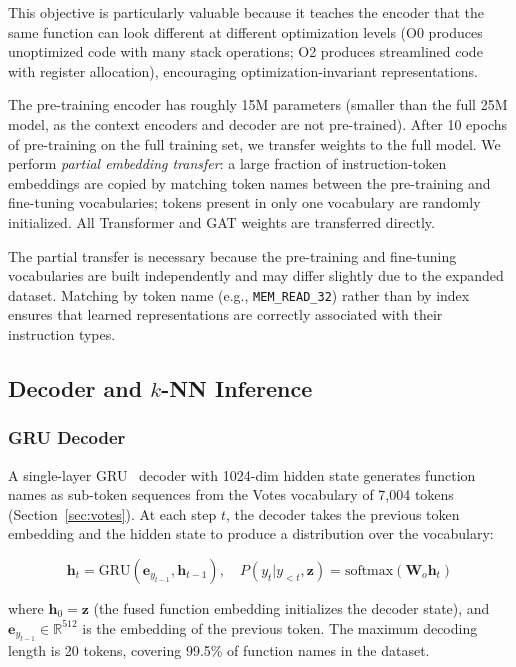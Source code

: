 \documentclass[sigconf,nonacm]{acmart}
\begin{document}
This objective is particularly valuable because it teaches the encoder that the same function can look different at different optimization levels (O0 produces unoptimized code with many stack operations; O2 produces streamlined code with register allocation), encouraging optimization-invariant representations.

The pre-training encoder has roughly 15M parameters (smaller than the full 25M model, as the context encoders and decoder are not pre-trained). After 10 epochs of pre-training on the full training set, we transfer weights to the full model. We perform \emph{partial embedding transfer}: a large fraction of instruction-token embeddings are copied by matching token names between the pre-training and fine-tuning vocabularies; tokens present in only one vocabulary are randomly initialized. All Transformer and GAT weights are transferred directly.

The partial transfer is necessary because the pre-training and fine-tuning vocabularies are built independently and may differ slightly due to the expanded dataset. Matching by token name (e.g., \texttt{MEM\_READ\_32}) rather than by index ensures that learned representations are correctly associated with their instruction types.

\subsection{Decoder and $k$-NN Inference}
\label{sec:decoder}

\subsubsection{GRU Decoder}
A single-layer GRU~\cite{gru} decoder with 1024-dim hidden state generates function names as sub-token sequences from the Votes vocabulary of 7{,}004 tokens (Section~\ref{sec:votes}). At each step $t$, the decoder takes the previous token embedding and the hidden state to produce a distribution over the vocabulary:

\begin{equation}
    \mathbf{h}_t = \text{GRU}(\mathbf{e}_{y_{t-1}}, \mathbf{h}_{t-1}), \quad P(y_t | y_{<t}, \mathbf{z}) = \text{softmax}(\mathbf{W}_o \mathbf{h}_t)
\end{equation}

where $\mathbf{h}_0 = \mathbf{z}$ (the fused function embedding initializes the decoder state), and $\mathbf{e}_{y_{t-1}} \in \mathbb{R}^{512}$ is the embedding of the previous token. The maximum decoding length is 20 tokens, covering 99.5\% of function names in the dataset.
\end{document}
